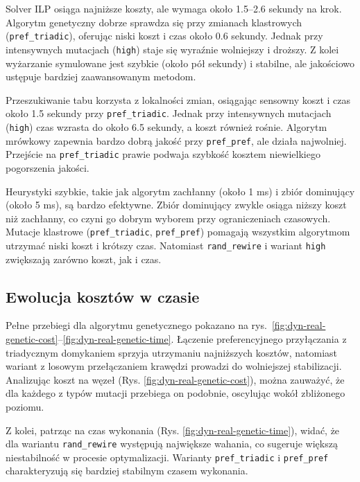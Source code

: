 Solver ILP osiąga najniższe koszty, ale wymaga około 1.5--2.6 sekundy na krok. Algorytm genetyczny dobrze sprawdza się przy zmianach klastrowych (\texttt{pref\_triadic}), oferując niski koszt i czas około 0.6 sekundy. Jednak przy intensywnych mutacjach (\texttt{high}) staje się wyraźnie wolniejszy i droższy. Z kolei wyżarzanie symulowane jest szybkie (około pół sekundy) i stabilne, ale jakościowo ustępuje bardziej zaawansowanym metodom.

Przeszukiwanie tabu korzysta z lokalności zmian, osiągając sensowny koszt i czas około 1.5 sekundy przy \texttt{pref\_triadic}. Jednak przy intensywnych mutacjach (\texttt{high}) czas wzrasta do około 6.5 sekundy, a koszt również rośnie. Algorytm mrówkowy zapewnia bardzo dobrą jakość przy \texttt{pref\_pref}, ale działa najwolniej. Przejście na \texttt{pref\_triadic} prawie podwaja szybkość kosztem niewielkiego pogorszenia jakości.

Heurystyki szybkie, takie jak algorytm zachłanny (około 1 ms) i zbiór dominujący (około 5 ms), są bardzo efektywne. Zbiór dominujący zwykle osiąga niższy koszt niż zachłanny, co czyni go dobrym wyborem przy ograniczeniach czasowych. Mutacje klastrowe (\texttt{pref\_triadic}, \texttt{pref\_pref}) pomagają wszystkim algorytmom utrzymać niski koszt i krótszy czas. Natomiast \texttt{rand\_rewire} i wariant \texttt{high} zwiększają zarówno koszt, jak i czas.

\subsection{Ewolucja kosztów w czasie}
Pełne przebiegi dla algorytmu genetycznego pokazano na rys.~\ref{fig:dyn-real-genetic-cost}--\ref{fig:dyn-real-genetic-time}. Łączenie preferencyjnego przyłączania z triadycznym domykaniem sprzyja utrzymaniu najniższych kosztów, natomiast wariant z losowym przełączaniem krawędzi prowadzi do wolniejszej stabilizacji. Analizując koszt na węzeł (Rys. \ref{fig:dyn-real-genetic-cost}), można zauważyć, że dla każdego z typów mutacji przebiega on podobnie, oscylując wokół zbliżonego poziomu.

Z kolei, patrząc na czas wykonania (Rys. \ref{fig:dyn-real-genetic-time}), widać, że dla wariantu \texttt{rand\_rewire} występują największe wahania, co sugeruje większą niestabilność w procesie optymalizacji. Warianty \texttt{pref\_triadic} i \texttt{pref\_pref} charakteryzują się bardziej stabilnym czasem wykonania.

